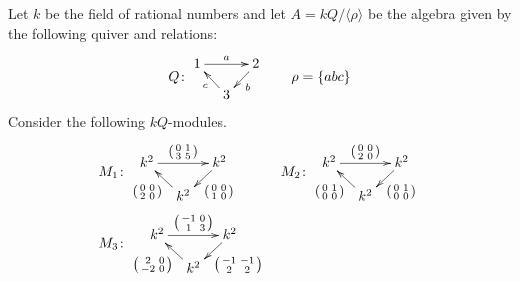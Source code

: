 \documentclass[a4paper]{amsart}
\begin{document}
\begin{Exercise}[title={Isomorphisms}]
Let $k$ be the field of rational numbers and let $A =
kQ/\langle\rho\rangle$ be the algebra given by the following quiver
and relations:
\[
Q\colon
\vcenter{\xymatrix@C=1em@R=1em{
1 \ar[rr]^a &&
2 \ar[dl]^b \\
& 3 \ar[ul]^c
}}
\qquad
\rho = \{ abc \}
\]
Consider the following $kQ$-modules.
\begin{align*}
M_1&\colon
\vcenter{\xymatrix@C=1em@R=1em{
k^2 \ar[rr]^{\left( \begin{smallmatrix} 0 & 1 \\ 3 & 5 \end{smallmatrix} \right)} &&
k^2 \ar[dl]^{\left( \begin{smallmatrix} 0 & 0 \\ 1 & 0 \end{smallmatrix} \right)} \\
&
k^2 \ar[ul]^{\left( \begin{smallmatrix} 0 & 0 \\ 2 & 0 \end{smallmatrix} \right)}
}}
&
M_2&\colon
\vcenter{\xymatrix@C=1em@R=1em{
k^2 \ar[rr]^{\left( \begin{smallmatrix} 0 & 0 \\ 2 & 0 \end{smallmatrix} \right)} &&
k^2 \ar[dl]^{\left( \begin{smallmatrix} 0 & 1 \\ 0 & 0 \end{smallmatrix} \right)} \\
&
k^2 \ar[ul]^{\left( \begin{smallmatrix} 0 & 1 \\ 0 & 0 \end{smallmatrix} \right)}
}}
\\
M_3&\colon
\vcenter{\xymatrix@C=1em@R=1em{
k^2 \ar[rr]^{\left( \begin{smallmatrix} -1 &  0 \\ 1 & 3 \end{smallmatrix} \right)} &&
k^2 \ar[dl]^{\left( \begin{smallmatrix} -1 & -1 \\ 2 & 2 \end{smallmatrix} \right)} \\
&
k^2 \ar[ul]^{\left( \begin{smallmatrix} 2 & 0 \\ -2 & 0 \end{smallmatrix} \right)}
}}
\end{align*}
\end{Exercise}
\end{document}
